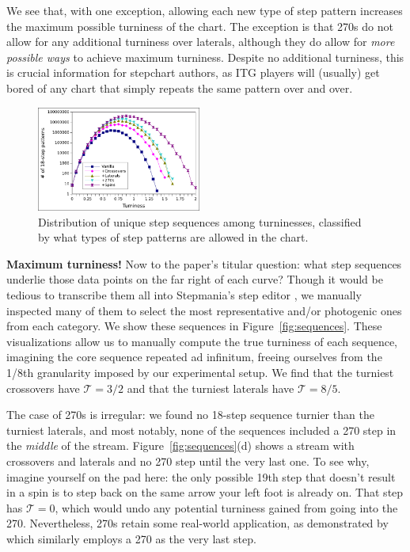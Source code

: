 \documentclass[10pt]{sigplanconf}
\begin{document}
We see that, with one exception, allowing each new type of step pattern increases the maximum possible turniness of the chart.
The exception is that 270s do not allow for any additional turniness over laterals, although they do allow for {\em more possible ways} to achieve maximum turniness.
Despite no additional turniness, this is crucial information for stepchart authors, as ITG players will (usually) get bored of any chart that simply repeats the same pattern over and over.

\begin{figure}[t]
	\begin{center}
	\includegraphics[width=0.48\textwidth]{turniness.pdf}
	\end{center}
	\caption{Distribution of unique step sequences among turninesses, classified by what types of step patterns are allowed in the chart.}
	\label{fig:graph}
\end{figure}

{\bf Maximum turniness!}
Now to the paper's titular question: what step sequences underlie those data points on the far right of each curve?
Though it would be tedious to transcribe them all into Stepmania's step editor \cite{stepmania}, we manually inspected many of them to select the most representative and/or photogenic ones from each category. We show these sequences in Figure~\ref{fig:sequences}.
These visualizations allow us to manually compute the true turniness of each sequence, imagining the core sequence repeated ad infinitum, freeing ourselves from the 1/8th granularity imposed by our experimental setup.
We find that the turniest crossovers have $\mathcal{T}=3/2$ and that the turniest laterals have $\mathcal{T}=8/5$.

The case of 270s is irregular: we found no 18-step sequence turnier than the turniest laterals, and most notably,
none of the sequences included a 270 step in the {\em middle} of the stream.
Figure~\ref{fig:sequences}(d) shows a stream with crossovers and laterals and no 270 step until the very last one.
To see why, imagine yourself on the pad here: the only possible 19th step that doesn't result in a spin is to step back on the same arrow your left foot is already on.
That step has $\mathcal{T}=0$, which would undo any potential turniness gained from going into the 270.
Nevertheless, 270s retain some real-world application, as demonstrated by \cite{utopia} which similarly employs a 270 as the very last step.
\end{document}
